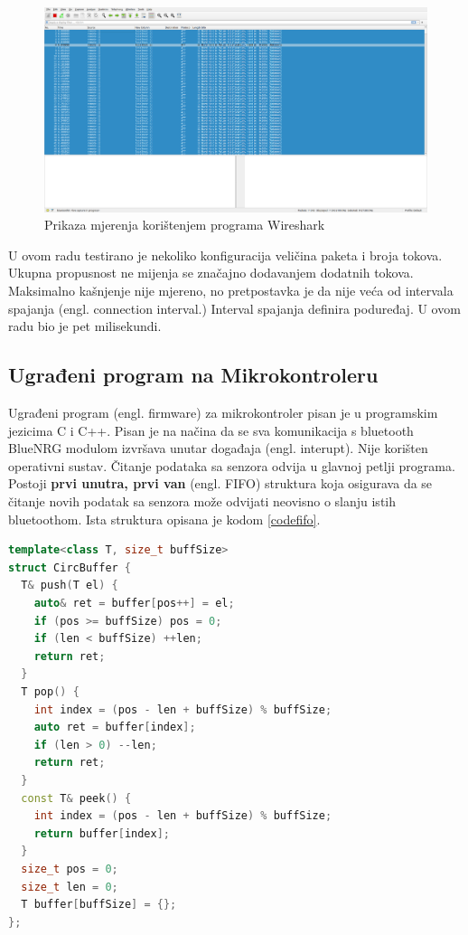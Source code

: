 \documentclass[times, utf8, diplomski]{diplomski}
\begin{document}
\begin{figure}[H]
\includegraphics[width=\textwidth]{wireshark_100sec_20230622_225645.png}
\centering
\caption{Prikaza mjerenja korištenjem programa Wireshark \cite{wireshark}}
\label{fig:wireshark}
\end{figure}

U ovom radu testirano je nekoliko konfiguracija veličina paketa i broja tokova. Ukupna propusnost ne mijenja se značajno dodavanjem dodatnih tokova. Maksimalno kašnjenje nije mjereno, no pretpostavka je da nije veća od intervala spajanja (engl. connection interval.) Interval spajanja definira poduređaj. U ovom radu bio je pet milisekundi.


\subsection{Ugrađeni program na Mikrokontroleru}
Ugrađeni program (engl. firmware) za mikrokontroler pisan je u programskim jezicima C i C++. Pisan je na načina da se sva komunikacija s bluetooth BlueNRG modulom izvršava unutar događaja (engl. interupt). Nije korišten operativni sustav. Čitanje podataka sa senzora odvija u glavnoj petlji programa. Postoji \textbf{prvi unutra, prvi van} (engl. FIFO) struktura koja osigurava da se čitanje novih podatak sa senzora može odvijati neovisno o slanju istih bluetoothom. Ista struktura opisana je kodom \ref{codefifo}.

\begin{lstlisting}[language=c++, caption={FIFO struktura koja omgučuje neovisan dohvat novih podataka i slanje najstarijih}, label={codefifo}]
template<class T, size_t buffSize>
struct CircBuffer {
  T& push(T el) {
    auto& ret = buffer[pos++] = el;
    if (pos >= buffSize) pos = 0;
    if (len < buffSize) ++len;
    return ret;
  }
  T pop() {
    int index = (pos - len + buffSize) % buffSize;
    auto ret = buffer[index];
    if (len > 0) --len;
    return ret;
  }
  const T& peek() {
    int index = (pos - len + buffSize) % buffSize;
    return buffer[index];
  }
  size_t pos = 0;
  size_t len = 0;
  T buffer[buffSize] = {};
};
\end{lstlisting}
\end{document}
